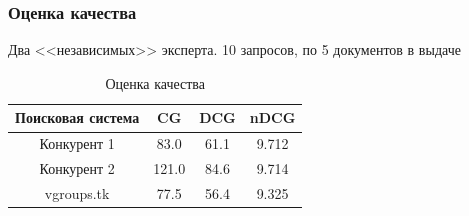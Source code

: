 \documentclass{beamer}
\begin{document}
\begin{frame}
  \frametitle{Оценка качества}
    Два <<независимых>> эксперта. 10 запросов, по 5 документов в выдаче
    \begin{center}
    \begin{table}[!htb]
      \begin{tabu}{|c|c|c|c|}
        \hline
        Поисковая система & CG    & DCG     & nDCG \\ \hline
        Конкурент 1       & 83.0  &  61.1   & 9.712  \\ \hline
        Конкурент 2       & 121.0 &  84.6   & 9.714   \\ \hline
        vgroups.tk        & 77.5  &  56.4   & 9.325   \\ \hline
      \end{tabu}
    \caption{Оценка качества}
    \end{table}
  \end{center}
\end{frame}
\end{document}
